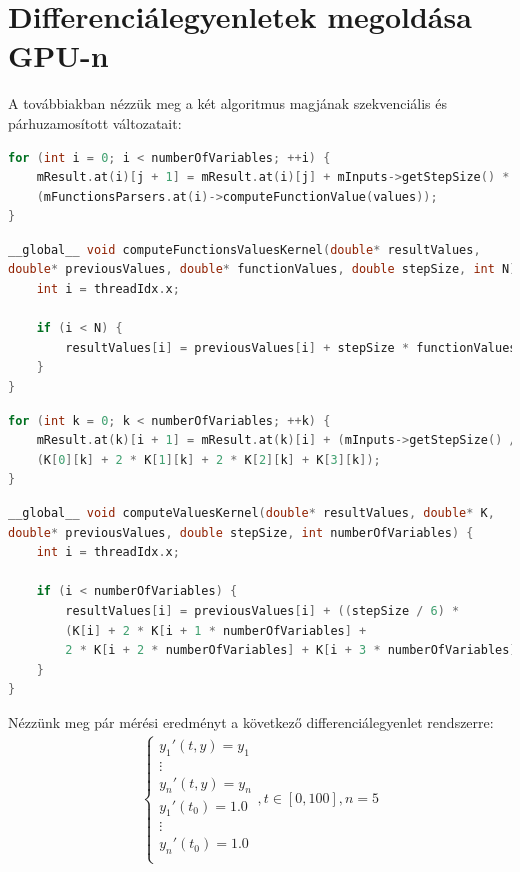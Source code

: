 \section {Differenciálegyenletek megoldása GPU-n} \label{fejezet3_4}


A továbbiakban nézzük meg a két algoritmus magjának szekvenciális és párhuzamosított változatait:
\begin{lstlisting}[caption={Euler módszer szekvenciális kód.}, captionpos=b, language = C++]
for (int i = 0; i < numberOfVariables; ++i) {
	mResult.at(i)[j + 1] = mResult.at(i)[j] + mInputs->getStepSize() *
	(mFunctionsParsers.at(i)->computeFunctionValue(values));
}
\end{lstlisting}

\begin{lstlisting}[caption={Euler módszer párhuzamosított kód.}, captionpos=b, language = C++]
__global__ void computeFunctionsValuesKernel(double* resultValues,
double* previousValues, double* functionValues, double stepSize, int N) {
	int i = threadIdx.x;
	
	if (i < N) {
		resultValues[i] = previousValues[i] + stepSize * functionValues[i];
	}
}
\end{lstlisting}

\begin{lstlisting}[caption={Runge-Kutta módszer szekvenciális kód.}, captionpos=b, language = C++]
for (int k = 0; k < numberOfVariables; ++k) {
	mResult.at(k)[i + 1] = mResult.at(k)[i] + (mInputs->getStepSize() / 6)*
	(K[0][k] + 2 * K[1][k] + 2 * K[2][k] + K[3][k]);
}
\end{lstlisting}

\begin{lstlisting}[caption={Runge-Kutta módszer párhuzamosított kód.}, captionpos=b, language = C++]
__global__ void computeValuesKernel(double* resultValues, double* K,
double* previousValues, double stepSize, int numberOfVariables) {
	int i = threadIdx.x;
	
	if (i < numberOfVariables) {
		resultValues[i] = previousValues[i] + ((stepSize / 6) *
		(K[i] + 2 * K[i + 1 * numberOfVariables] +
		2 * K[i + 2 * numberOfVariables] + K[i + 3 * numberOfVariables]));
	}
}
\end{lstlisting}

Nézzünk meg pár mérési eredményt a következő differenciálegyenlet rendszerre:
\begin{align}
	\begin{cases}
		y_{1}'(t, y) = y_{1} \\
		\vdots \\
		y_{n}'(t, y) = y_{n}\\
		y_{1}'(t_{0}) = 1.0 \\
		\vdots \\
		y_{n}'(t_{0}) = 1.0\\
	\end{cases}
	, t\in[0, 100], n = 5
\end{align}

